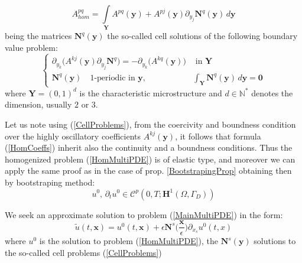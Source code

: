 \begin{equation}
    \label{HomCoeffs}
    A^{pq}_{hom} = \int \limits_{\mathbf{Y}} A^{pq}(\mathbf{y}) + A^{pj} (\mathbf{y}) \partial_{y_j} \mathbf{N}^q (\mathbf{y}) \, d\mathbf{y}
\end{equation}
being the matrices $\mathbf{N}^q(\mathbf{y})$ the so-called cell solutions of the following boundary value problem:
\begin{equation}
    \label{CellProblems}
    \left \{
    \begin{array}{cc}
        \partial_{y_k} \big( A^{kj}(\mathbf{y}) \partial_{y_j} \mathbf{N}^q \big) = -\partial_{y_k} \big( A^{kq}(\mathbf{y}) \big) & \text{ in } \mathbf{Y} \\
        \mathbf{N}^q(\mathbf{y}) \quad 1\text{-periodic in } \mathbf{y}, & \int_{\mathbf{Y}}  \mathbf{N}^q (\mathbf{y}) \, d\mathbf{y} = \mathbf{0}
    \end{array}
    \right .
\end{equation}
where $\mathbf{Y} = (0,1)^d$ is the characteristic microstructure and $d \in \mathbb{N}^*$ denotes the dimension, usually $2$ or $3$.\\

\begin{rem}
 Let us note using (\ref{CellProblems}), from the coercivity and boundness condition over the highly oscillatory coefficients $A^{kj}(\mathbf{y})$, it follows that formula (\ref{HomCoeffs}) inherit also the continuity and a boundness conditions. Thus the homogenized problem (\ref{HomMultiPDE}) is of elastic type, and moreover we can apply the same proof as in the case of prop. \ref{BootstrapingProp} obtaining then by bootstraping method:
 \begin{equation*}
     u^0, \, \partial_{t} u^0 \in \mathcal{C}^p (0,T; \mathbf{H}^1(\Omega, \Gamma_D))
 \end{equation*}
\end{rem}

We seek an approximate solution to problem (\ref{MainMultiPDE}) in the form:
\begin{equation}
    \label{Asymptotic}
    \tilde{u}(t,\mathbf{x}) = u^0 (t,\mathbf{x}) + \epsilon \mathbf{N}^{s} \big(\frac{\mathbf{x}}{\epsilon} \big) \partial_{x_s} u^0(t,x)
\end{equation}
where $u^0$ is the solution to problem (\ref{HomMultiPDE}), the $\mathbf{N}^{s} (\mathbf{y})$ solutions to the so-called cell problems (\ref{CellProblems})


